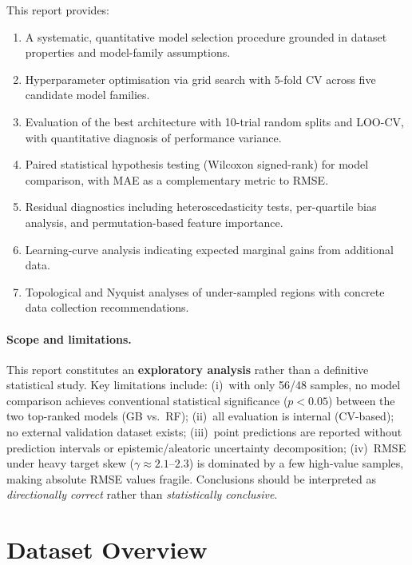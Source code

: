 \documentclass[12pt,a4paper]{article}
\begin{document}
This report provides:
\begin{enumerate}[leftmargin=*]
  \item A systematic, quantitative model selection procedure grounded in
        dataset properties and model-family assumptions.
  \item Hyperparameter optimisation via grid search with 5-fold CV across
        five candidate model families.
  \item Evaluation of the best architecture with 10-trial random splits
        and LOO-CV, with quantitative diagnosis of performance variance.
  \item Paired statistical hypothesis testing (Wilcoxon signed-rank) for
        model comparison, with MAE as a complementary metric to RMSE.
  \item Residual diagnostics including heteroscedasticity tests,
        per-quartile bias analysis, and permutation-based feature importance.
  \item Learning-curve analysis indicating expected marginal gains from
        additional data.
  \item Topological and Nyquist analyses of under-sampled regions with
        concrete data collection recommendations.
\end{enumerate}

\paragraph{Scope and limitations.}
This report constitutes an \textbf{exploratory analysis} rather than a
definitive statistical study.  Key limitations include:
(i)~with only 56/48 samples, no model comparison achieves conventional
statistical significance ($p < 0.05$) between the two top-ranked models
(GB vs.\ RF);
(ii)~all evaluation is internal (CV-based); no external validation dataset
exists;
(iii)~point predictions are reported without prediction intervals or
epistemic/aleatoric uncertainty decomposition;
(iv)~RMSE under heavy target skew ($\gamma \approx 2.1$--$2.3$) is
dominated by a few high-value samples, making absolute RMSE values
fragile.
Conclusions should be interpreted as \emph{directionally correct} rather
than \emph{statistically conclusive}.

\section{Dataset Overview}
\label{sec:dataset}
\end{document}
